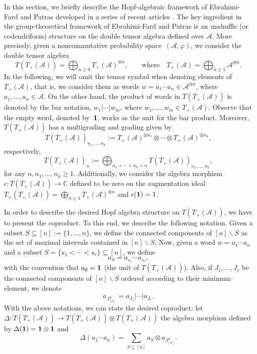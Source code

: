 \documentclass[pdftex]{sigma}%
\numberwithin{equation}{section}
\newcommand{\A}{\mathcal{A}}
\newcommand{\uno}{{\bf{1}}}
\begin{document}
In this section, we briefly describe the Hopf-algebraic framework of Ebrahimi-Fard and Patras developed in a series of recent articles \cite{EFP1, EFP2, EFP3, EFP4, EFP5}. The key ingredient in the group-theoretical framework of Ebrahimi-Fard and Patras is an unshuffle (or codendriform) structure on the double tensor algebra defined over $\A$. More precisely, given a noncommutative probability space~$(\A,\varphi)$, we consider the double tensor algebra
\[
	T(T_+(\A)) = \bigoplus_{n\geq0} T_+(\A)^{\otimes n},
	\qquad\text{where}\quad
	T_+(\A) = \bigoplus_{n\geq1} \A^{\otimes n}.
\]
In the following, we will omit the tensor symbol when denoting elements of $T_+(\A)$, that is, we consider them as words $w = a_1\cdots a_n \in \A^{\otimes n}$, where $a_1,\dots,a_n\in \A$. On the other hand, the product of words in $T(T_+(\A))$ is denoted by the bar notation, $w_1|\cdots |w_m$, where $w_1,\dots,w_m \allowbreak\in T_+(\A)$. Observe that the empty word, denoted by~$\uno$, works as the unit for the bar product. Moreover, $T(T_+(\A))$ has a multigrading and grading given by
\[
	T(T_+(\A))_{n_1,\dots,n_k}
	:= T_+(\A)^{\otimes n_1} \otimes \cdots \otimes T_+(\A)^{\otimes n_k},
\]
respectively,
\[
	T(T_+(\A))_n :=
	\bigoplus_{n_1+\cdots + n_k = n} T(T_+(\A))_{n_1,\dots,n_k},
\]
for any $n,n_1,\dots,n_k\geq1$. Additionally, we consider the algebra morphism $\epsilon\colon T(T_+(\A))\to\mathbb{C}$ defined to be zero on the augmentation ideal $T_+(T_+(\A)) = \bigoplus_{n\geq 1} T_+(\A)^{\otimes n}$ and $\epsilon(\uno) = 1$.

In order to describe the desired Hopf algebra structure on $T(T_+(\A))$, we have to present the coproduct. To this end,
 we describe the following notation. Given a subset $S\subseteq [n] :=\{1,\dots, n\}$, we define the connected components of $[n]\backslash S$ as the set of maximal intervals contained in $[n]\backslash S$. Now, given a word $w= a_1\cdots a_n$ and a subset $S = \{s_1 <\cdots < s_r\} \subseteq [n]$, we define
\[
	a_S = a_{s_1}\cdots a_{s_r},
\]
with the convention that $a_\emptyset = \uno$ (the unit of $T(T_+(\A))$). Also, if $J_1,\dots,J_r$ be the connected components of $[n] \backslash S$ ordered according to their minimum element, we denote
\[
	a_{J_{[n]}^S} = a_{J_1} | \cdots | a_{J_r}.
\]
With the above notations, we can state the desired coproduct: let $\Delta\colon T(T_+(\A))\to T(T_+(\A))\otimes T(T_+(\A))$ the algebra morphism defined by $\Delta(\uno) = \uno\otimes \uno$ and
\begin{equation}
\label{eq:copEFP}
	\Delta(a_1\cdots a_n)= \sum_{S\subseteq [n]} a_S \otimes a_{J_{[n]}^S}.
\end{equation}
\end{document}
